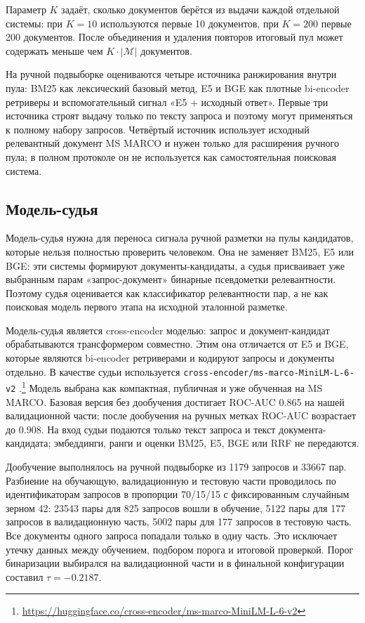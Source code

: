 \documentclass[runningheads,a4paper]{llncs}
\begin{document}
Параметр $K$ задаёт, сколько документов берётся из выдачи каждой отдельной системы: при $K=10$ используются первые 10 документов, при $K=200$ \textemdash{} первые 200 документов. После объединения и удаления повторов итоговый пул может содержать меньше чем $K \cdot |\mathcal{M}|$ документов.

На ручной подвыборке оцениваются четыре источника ранжирования внутри пула: BM25 как лексический базовый метод, E5 и BGE как плотные bi-encoder ретриверы и вспомогательный сигнал «E5 + исходный ответ». Первые три источника строят выдачу только по тексту запроса и поэтому могут применяться к полному набору запросов. Четвёртый источник использует исходный релевантный документ MS MARCO и нужен только для расширения ручного пула; в полном протоколе он не используется как самостоятельная поисковая система.

\subsection{Модель-судья}

Модель-судья нужна для переноса сигнала ручной разметки на пулы кандидатов, которые нельзя полностью проверить человеком. Она не заменяет BM25, E5 или BGE: эти системы формируют документы-кандидаты, а судья присваивает уже выбранным парам «запрос-документ» бинарные псевдометки релевантности. Поэтому судья оценивается как классификатор релевантности пар, а не как поисковая модель первого этапа на исходной эталонной разметке.

Модель-судья является cross-encoder моделью: запрос и документ-кандидат обрабатываются трансформером совместно. Этим она отличается от E5 и BGE, которые являются bi-encoder ретриверами и кодируют запросы и документы отдельно. В качестве судьи используется \texttt{cross-encoder/ms-marco-MiniLM-L-6-v2} \cite{wang2020minilm,reimers2019sentencebert}.\footnote{\url{https://huggingface.co/cross-encoder/ms-marco-MiniLM-L-6-v2}} Модель выбрана как компактная, публичная и уже обученная на MS MARCO. Базовая версия без дообучения достигает ROC-AUC 0.865 на нашей валидационной части; после дообучения на ручных метках ROC-AUC возрастает до 0.908. На вход судьи подаются только текст запроса и текст документа-кандидата; эмбеддинги, ранги и оценки BM25, E5, BGE или RRF не передаются.

Дообучение выполнялось на ручной подвыборке из 1179 запросов и 33667 пар. Разбиение на обучающую, валидационную и тестовую части проводилось по идентификаторам запросов в пропорции 70/15/15 с фиксированным случайным зерном 42: 23543 пары для 825 запросов вошли в обучение, 5122 пары для 177 запросов \textemdash{} в валидационную часть, 5002 пары для 177 запросов \textemdash{} в тестовую часть. Все документы одного запроса попадали только в одну часть. Это исключает утечку данных между обучением, подбором порога и итоговой проверкой. Порог бинаризации выбирался на валидационной части и в финальной конфигурации составил $\tau = -0.2187$.
\end{document}
